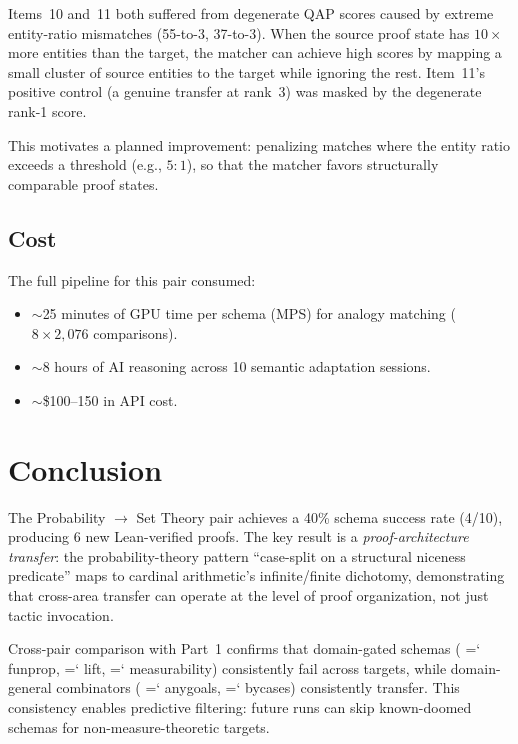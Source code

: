 \documentclass[11pt]{article}
\renewcommand{\texttt}[1]{%
  \begingroup\ttfamily\hyphenchar\font=`\-\relax
  \def\_{\textunderscore\discretionary{}{}{}}%
  #1\endgroup}
\theoremstyle{definition}
\theoremstyle{remark}
\begin{document}
Items~10 and~11 both suffered from degenerate QAP scores caused by
extreme entity-ratio mismatches (55-to-3, 37-to-3).  When the
source proof state has $10\times$ more entities than the target, the
matcher can achieve high scores by mapping a small cluster of source
entities to the target while ignoring the rest.  Item~11's positive
control (a genuine transfer at rank~3) was masked by the degenerate
rank-1 score.

This motivates a planned improvement: penalizing matches where the
entity ratio exceeds a threshold (e.g., $5:1$), so that the matcher
favors structurally comparable proof states.

\subsection{Cost}

The full pipeline for this pair consumed:
\begin{itemize}
\item ${\sim}$25 minutes of GPU time per schema (MPS) for analogy
  matching ($8 \times 2{,}076$ comparisons).
\item ${\sim}$8 hours of AI reasoning across 10 semantic adaptation
  sessions.
\item ${\sim}$\$100--150 in API cost.
\end{itemize}

\section{Conclusion}\label{sec:conclusion}

The Probability $\to$ Set Theory pair achieves a 40\% schema success
rate (4/10), producing 6 new Lean-verified proofs.  The key result is a
\emph{proof-architecture transfer}: the probability-theory pattern
``case-split on a structural niceness predicate'' maps to cardinal
arithmetic's infinite/finite dichotomy, demonstrating that
cross-area transfer can operate at the level of proof organization,
not just tactic invocation.

Cross-pair comparison with Part~1 confirms that domain-gated
schemas (\texttt{fun\_prop}, \texttt{lift}, \texttt{measurability})
consistently fail across targets, while domain-general
combinators (\texttt{any\_goals}, \texttt{by\_cases}) consistently
transfer.  This consistency enables predictive filtering: future
runs can skip known-doomed schemas for non-measure-theoretic targets.
\end{document}
